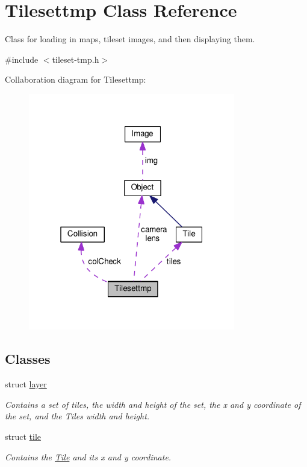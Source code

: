 \hypertarget{classTilesettmp}{}\section{Tilesettmp Class Reference}
\label{classTilesettmp}


Class for loading in maps, tileset images, and then displaying them.  




{\ttfamily \#include $<$tileset-\/tmp.\+h$>$}



Collaboration diagram for Tilesettmp\+:\nopagebreak
\begin{figure}[H]
\begin{center}
\leavevmode
\includegraphics[width=256pt]{classTilesettmp__coll__graph}
\end{center}
\end{figure}
\subsection*{Classes}
\begin{DoxyCompactItemize}
\item 
struct \hyperlink{structTilesettmp_1_1layer}{layer}
\begin{DoxyCompactList}\small\item\em Contains a set of tiles, the width and height of the set, the x and y coordinate of the set, and the Tiles width and height. \end{DoxyCompactList}\item 
struct \hyperlink{structTilesettmp_1_1tile}{tile}
\begin{DoxyCompactList}\small\item\em Contains the \hyperlink{classTile}{Tile} and its x and y coordinate. \end{DoxyCompactList}\end{DoxyCompactItemize}
